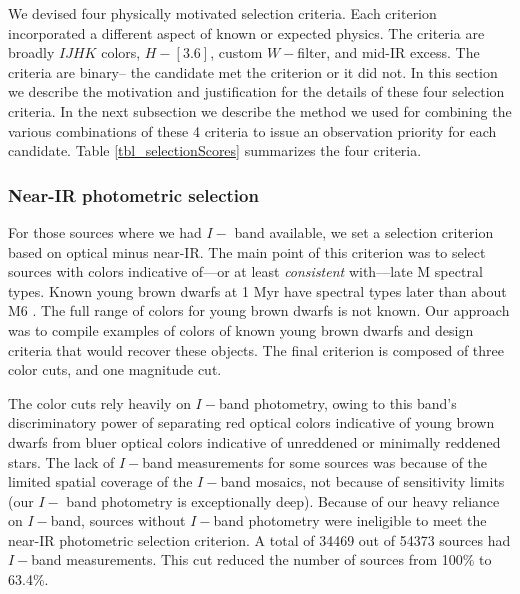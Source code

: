 We devised four physically motivated selection criteria.  Each criterion incorporated a different aspect of known or expected physics.  The criteria are broadly $IJHK$ colors, $H- [3.6]$, custom $W-$filter, and mid-IR excess.  The criteria are binary-- the candidate met the criterion or it did not.  In this section we describe the motivation and justification for the details of these four selection criteria.  In the next subsection we describe the method we used for combining the various combinations of these 4 criteria to issue an observation priority for each candidate.  Table \ref{tbl_selectionScores} summarizes the four criteria.



\subsubsection{Near-IR photometric selection}
\label{sec_NIR_selection}

For those sources where we had $I-$ band available, we set a selection criterion based on optical minus near-IR.  The main point of this criterion was to select sources with colors indicative of---or at least \emph{consistent} with---late M spectral types.  Known young brown dwarfs at 1 Myr have spectral types later than about M6 \citep{2012ARA&A..50...65L}.  The full range of colors for young brown dwarfs is not known.  Our approach was to compile examples of colors of known young brown dwarfs and design criteria that would recover these objects.  The final criterion is composed of three color cuts, and one magnitude cut.

The color cuts rely heavily on $I-$band photometry, owing to this band's discriminatory power of separating red optical colors indicative of young brown dwarfs from bluer optical colors indicative of unreddened or minimally reddened stars.  The lack of $I-$band measurements for some sources was because of the limited spatial coverage of the $I-$band mosaics, not because of sensitivity limits (our $I-$ band photometry is exceptionally deep).  Because of our heavy reliance on $I-$band, sources without $I-$band photometry were ineligible to meet the near-IR photometric selection criterion.  A total of 34469 out of 54373 sources had $I-$band measurements.  This cut reduced the number of sources from 100\% to 63.4\%.

